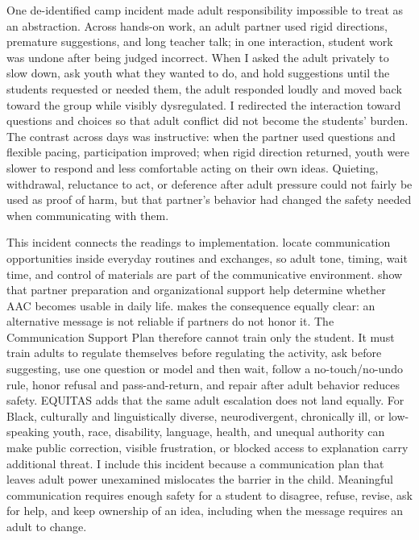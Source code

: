 One de-identified camp incident made adult responsibility impossible to treat as an abstraction. Across hands-on work, an adult partner used rigid directions, premature suggestions, and long teacher talk; in one interaction, student work was undone after being judged incorrect. When I asked the adult privately to slow down, ask youth what they wanted to do, and hold suggestions until the students requested or needed them, the adult responded loudly and moved back toward the group while visibly dysregulated. I redirected the interaction toward questions and choices so that adult conflict did not become the students' burden. The contrast across days was instructive: when the partner used questions and flexible pacing, participation improved; when rigid direction returned, youth were slower to respond and less comfortable acting on their own ideas. Quieting, withdrawal, reluctance to act, or deference after adult pressure could not fairly be used as proof of harm, but that partner's behavior had changed the safety needed when communicating with them.

This incident connects the readings to implementation. \citet{downing2015classroom} locate communication opportunities inside everyday routines and exchanges, so adult tone, timing, wait time, and control of materials are part of the communicative environment. \citet{norrie2021context} show that partner preparation and organizational support help determine whether AAC becomes usable in daily life. \citet{peckhamhardin2015behavior} makes the consequence equally clear: an alternative message is not reliable if partners do not honor it. The Communication Support Plan therefore cannot train only the student. It must train adults to regulate themselves before regulating the activity, ask before suggesting, use one question or model and then wait, follow a no-touch/no-undo rule, honor refusal and pass-and-return, and repair after adult behavior reduces safety. EQUITAS adds that the same adult escalation does not land equally. For Black, culturally and linguistically diverse, neurodivergent, chronically ill, or low-speaking youth, race, disability, language, health, and unequal authority can make public correction, visible frustration, or blocked access to explanation carry additional threat. I include this incident because a communication plan that leaves adult power unexamined mislocates the barrier in the child. Meaningful communication requires enough safety for a student to disagree, refuse, revise, ask for help, and keep ownership of an idea, including when the message requires an adult to change.
